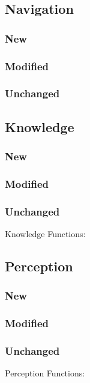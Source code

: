 \documentclass[main.tex]{subfiles}
\begin{document}
                \subsection{Navigation}
                \subsubsection{New}
                \subsubsection{Modified}
                \subsubsection{Unchanged}
                
                \subsection{Knowledge}
                \subsubsection{New}
                \subsubsection{Modified}
                \subsubsection{Unchanged}Knowledge Functions:
                
                \subsection{Perception}
                \subsubsection{New}
                \subsubsection{Modified}
                \subsubsection{Unchanged}Perception Functions:
                
\end{document}

